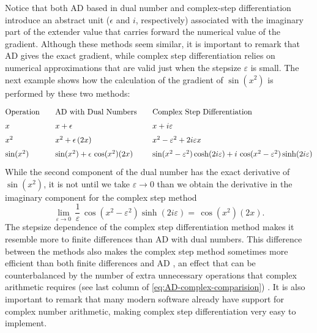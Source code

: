 Notice that both AD based in dual number and complex-step differentiation introduce an abstract unit ($\epsilon$ and $i$, respectively) associated with the imaginary part of the extender value that carries forward the numerical value of the gradient.
Although these methods seem similar, it is important to remark that AD gives the exact gradient, while complex step differentiation relies on numerical approximations that are valid just when the stepsize $\varepsilon$ is small. 
The next example shows how the calculation of the gradient of $\sin (x^2)$ is performed by these two methods:
\begin{equation}
\renewcommand{\arraystretch}{1.5}
\begin{tabular}{@{} l @{\qquad} l @{\qquad} l @{}}
Operation & AD with Dual Numbers  & Complex Step Differentiation \\
$x$ & $x + \epsilon$    & $x + i \varepsilon$ \\
$x^2$ & $x^2 + \epsilon \, (2x)$  & $x^2 - \varepsilon^2 + 2i\varepsilon x$\\
$\sin(x^2)$  & $\sin(x^2) + \epsilon \, \cos(x^2) (2x)$ &
$\sin(x^2 - \varepsilon^2) \cosh (2i\varepsilon) + i \, \cos(x^2 - \varepsilon^2) \sinh (2i\varepsilon)$
\end{tabular}
\label{eq:AD-complex-comparision}
\end{equation}
While the second component of the dual number has the exact derivative of $\sin(x^2)$, it is not until we take $\varepsilon \rightarrow 0$ than we obtain the derivative in the imaginary component for the complex step method
\begin{equation}
    \lim_{\varepsilon \rightarrow 0} \, \frac{1}{\varepsilon} \, \cos(x^2 - \varepsilon^2) \sinh (2i\varepsilon) 
    = 
    \, \cos(x^2) (2x).
\end{equation}
The stepsize dependence of the complex step differentiation method makes it resemble more to finite differences than AD with dual numbers. 
This difference between the methods also makes the complex step method sometimes more efficient than both finite differences and AD \cite{Lantoine_Russell_Dargent_2012}, an effect that can be counterbalanced by the number of extra unnecessary operations that complex arithmetic requires (see last column of \eqref{eq:AD-complex-comparision}) \cite{Martins_Sturdza_Alonso_2003_complex_differentiation}.
It is also important to remark that many modern software already have support for complex number arithmetic, making complex step differentiation very easy to implement.

